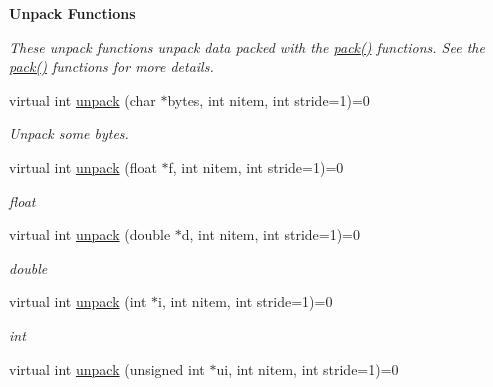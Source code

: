 \begin{Indent}\textbf{ Unpack Functions}\par
{\em These unpack functions unpack data packed with the \hyperlink{classMWRMComm_a611ac04479ee1c3731cf459427d18fb4}{pack()} functions. See the \hyperlink{classMWRMComm_a611ac04479ee1c3731cf459427d18fb4}{pack()} functions for more details. }\begin{DoxyCompactItemize}
\item 
\mbox{\label{classMWRMComm_af5fe22ee99ecbb178dad85b6474fe61f}} 
virtual int \hyperlink{classMWRMComm_af5fe22ee99ecbb178dad85b6474fe61f}{unpack} (char $\ast$bytes, int nitem, int stride=1)=0
\begin{DoxyCompactList}\small\item\em Unpack some bytes. \end{DoxyCompactList}\item 
\mbox{\label{classMWRMComm_a7e2abe0edd1daee09e8dedf33b6ad76d}} 
virtual int \hyperlink{classMWRMComm_a7e2abe0edd1daee09e8dedf33b6ad76d}{unpack} (float $\ast$f, int nitem, int stride=1)=0
\begin{DoxyCompactList}\small\item\em float \end{DoxyCompactList}\item 
\mbox{\label{classMWRMComm_a477b4686600d40320ae1c39caed4aca1}} 
virtual int \hyperlink{classMWRMComm_a477b4686600d40320ae1c39caed4aca1}{unpack} (double $\ast$d, int nitem, int stride=1)=0
\begin{DoxyCompactList}\small\item\em double \end{DoxyCompactList}\item 
\mbox{\label{classMWRMComm_a28fc7b564580ee8d1fb0307e36b7d4f8}} 
virtual int \hyperlink{classMWRMComm_a28fc7b564580ee8d1fb0307e36b7d4f8}{unpack} (int $\ast$i, int nitem, int stride=1)=0
\begin{DoxyCompactList}\small\item\em int \end{DoxyCompactList}\item 
\mbox{\label{classMWRMComm_aa8e6d63675e60f4323eba279906b98c1}} 
virtual int \hyperlink{classMWRMComm_aa8e6d63675e60f4323eba279906b98c1}{unpack} (unsigned int $\ast$ui, int nitem, int stride=1)=0

\end{DoxyCompactItemize}
\end{Indent}
